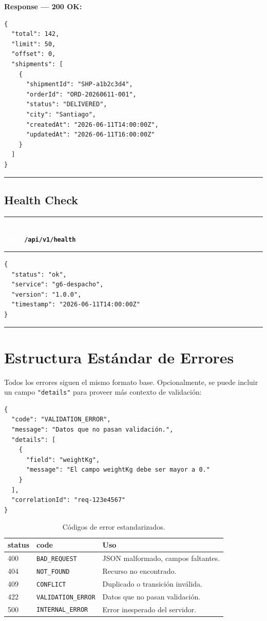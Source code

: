 \documentclass[11pt, a4paper]{article}
\newcommand{\httpmethod}[2]{%
  \colorbox{#1}{\textcolor{white}{\textbf{\small\textsf{#2}}}}%
}
\newcommand{\routeheader}[3]{%
  \noindent\rule{\textwidth}{1.5pt}\\[0.3em]
  \httpmethod{#1}{#2}\;\texttt{\bfseries #3}\\[0.3em]
  \rule{\textwidth}{0.4pt}
  \vspace{0.3cm}
}
\begin{document}
\textbf{Response --- 200 OK:}

\begin{lstlisting}
{
  "total": 142,
  "limit": 50,
  "offset": 0,
  "shipments": [
    {
      "shipmentId": "SHP-a1b2c3d4",
      "orderId": "ORD-20260611-001",
      "status": "DELIVERED",
      "city": "Santiago",
      "createdAt": "2026-06-11T14:00:00Z",
      "updatedAt": "2026-06-11T16:00:00Z"
    }
  ]
}
\end{lstlisting}

\noindent\rule{\textwidth}{0.4pt}

\subsection{Health Check}

\routeheader{get}{GET}{/api/v1/health}

\begin{lstlisting}
{
  "status": "ok",
  "service": "g6-despacho",
  "version": "1.0.0",
  "timestamp": "2026-06-11T14:00:00Z"
}
\end{lstlisting}

\noindent\rule{\textwidth}{0.4pt}


\section{Estructura Estándar de Errores}
\label{sec:errores}

Todos los errores siguen el mismo formato base. Opcionalmente, se puede incluir un campo \texttt{"details"} para proveer más contexto de validación:

\begin{lstlisting}
{
  "code": "VALIDATION_ERROR",
  "message": "Datos que no pasan validación.",
  "details": [
    {
      "field": "weightKg",
      "message": "El campo weightKg debe ser mayor a 0."
    }
  ],
  "correlationId": "req-123e4567"
}
\end{lstlisting}

\begin{table}[ht!]
\centering
\renewcommand{\arraystretch}{1.4}
\begin{tabularx}{\textwidth}{l l X}
  \toprule
  \textbf{status} & \textbf{code} & \textbf{Uso} \\
  \midrule
  400 & \texttt{BAD\_REQUEST}      & JSON malformado, campos faltantes. \\
  404 & \texttt{NOT\_FOUND}        & Recurso no encontrado. \\
  409 & \texttt{CONFLICT}          & Duplicado o transición inválida. \\
  422 & \texttt{VALIDATION\_ERROR} & Datos que no pasan validación. \\
  500 & \texttt{INTERNAL\_ERROR}   & Error inesperado del servidor. \\
  \bottomrule
\end{tabularx}
\caption{Códigos de error estandarizados.}
\end{table}
\end{document}
